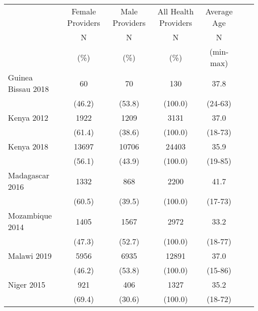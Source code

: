 \def\sym#1{\ifmmode^{#1}\else\(^{#1}\)\fi}
\begin{tabular}{l*{6}{c}}
\hline\hline
         &\multicolumn{1}{c}{Female Providers}&\multicolumn{1}{c}{Male Providers}&\multicolumn{1}{c}{All Health Providers}&\multicolumn{1}{c}{Average Age}&\\
               &       N&                     N&       N&                                       N\\
               &     (\%)&                 (\%)&    (\%)&                                     (min-max)\\
\hline
Guinea Bissau 2018&            {60}&                {70}&           {130}&              {37.8}\\
&                                              {(46.2)}&      {(53.8)}&             {(100.0)}&            {(24-63)}\\
Kenya 2012&                            {1922}&                {1209}&           {3131}&              {37.0}\\
&                                              {(61.4)}&      {(38.6)}&             {(100.0)}&            {(18-73)}\\
Kenya 2018&                    {13697}&                {10706}&           {24403}&              {35.9}\\
&                                              {(56.1)}&      {(43.9)}&             {(100.0)}&            {(19-85)}\\
Madagascar 2016&               {1332}&                {868}&           {2200}&              {41.7}\\
&                                              {(60.5)}&      {(39.5)}&             {(100.0)}&            {(17-73)}\\
Mozambique 2014&               {1405}&                {1567}&           {2972}&              {33.2}\\
&                                              {(47.3)}&      {(52.7)}&             {(100.0)}&            {(18-77)}\\
Malawi 2019&                   {5956}&                {6935}&           {12891}&              {37.0}\\
&                                              {(46.2)}&      {(53.8)}&             {(100.0)}&            {(15-86)}\\
Niger 2015&                    {921}&                {406}&           {1327}&              {35.2}\\
&                                              {(69.4)}&      {(30.6)}&             {(100.0)}&            {(18-72)}\\

\end{tabular}

